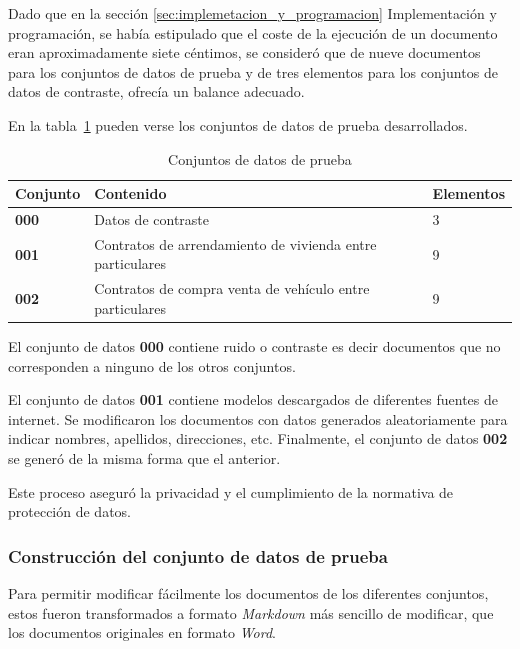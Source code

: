 Dado que en la sección \ref{sec:implemetacion_y_programacion} Implementación y programación, se había estipulado
que el coste de la ejecución de un documento eran aproximadamente siete céntimos, se consideró que de nueve documentos
para los conjuntos de datos de prueba y de tres elementos para los conjuntos de datos de contraste, ofrecía un
balance adecuado.

En la tabla~\ref{tab:data_sets} pueden verse los conjuntos de datos de prueba desarrollados.

\begin{table}[h]
    \renewcommand{\arraystretch}{1.5}
    \setlength{\tabcolsep}{10pt}
    \begin{tabular}{>{\bfseries}p{} p{} p{}}
        \toprule
        \textbf{Conjunto} & \textbf{Contenido}                                        & \textbf{Elementos} \\
        \midrule
        \textbf{000}      & Datos de contraste                                        & 3                  \\
        \textbf{001}      & Contratos de arrendamiento de vivienda entre particulares & 9                  \\
        \textbf{002}      & Contratos de compra venta de vehículo entre particulares  & 9                  \\
        \bottomrule
    \end{tabular}
    \caption{Conjuntos de datos de prueba}
    \label{tab:data_sets}
\end{table}

El conjunto de datos \textbf{000} contiene ruido o contraste es decir documentos que no corresponden a ninguno de los
otros conjuntos.

El conjunto de datos \textbf{001} contiene modelos descargados de diferentes fuentes de internet.
Se modificaron los documentos con datos generados aleatoriamente para indicar nombres, apellidos, direcciones, etc.
Finalmente, el conjunto de datos \textbf{002} se generó de la misma forma que el anterior.

Este proceso aseguró la privacidad y el cumplimiento de la normativa de protección de datos.

\subsubsection{Construcción del conjunto de datos de prueba}

Para permitir modificar fácilmente los documentos de los diferentes conjuntos, estos fueron transformados a formato
\textit{Markdown} más sencillo de modificar, que los documentos originales en formato \textit{Word}.

